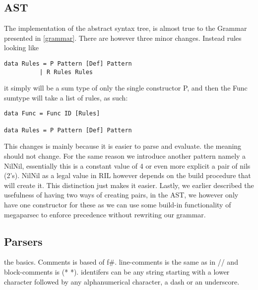\documentclass[a4paper]{article}
\begin{document}
\subsection{AST}
\label{sec:orga05e8aa}
The implementation of the abstract syntax tree, is almost true to the Grammar presented in \ref{grammar}. There are however three minor changes. Instead rules looking like
\begin{verbatim}
data Rules = P Pattern [Def] Pattern
          | R Rules Rules
\end{verbatim}
it simply will be a sum type of only the single constructor P, and then the Func sumtype will take a list of rules, as such:
\begin{verbatim}
data Func = Func ID [Rules]

data Rules = P Pattern [Def] Pattern
\end{verbatim}
This changes is mainly because it is easier to parse and evaluate. the meaning should not change.
For the same reason we introduce another pattern namely a NilNil, essentially this is a constant value of 4 or even more explicit a pair of nils (2's). NilNil as a legal value in RIL however depends on the build procedure that will create it. This distinction just makes it easier.
Lastly, we earlier described the usefulness of having two ways of creating pairs, in the AST, we however only have one constructor for these as we can use some build-in functionality of megaparsec to enforce precedence without rewriting our grammar.

\subsection{Parsers}
\label{sec:org173de64}
the basics.
Comments is based of f\#. line-comments is the same as in // and block-comments is (* *). identifers can be any string starting with a lower character followed by any alphanumerical character, a dash or an underscore.
\end{document}
